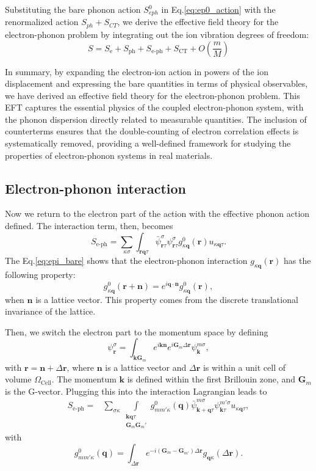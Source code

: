 \documentclass[%
 reprint,
superscriptaddress,
 amsmath,amssymb,
 aps,
prx,
]{revtex4-2}
\newcommand{\br}{\mathbf{r}}
\newcommand{\bq}{\mathbf{q}}
\newcommand{\bk}{\mathbf{k}}
\newcommand{\bG}{\mathbf{G}}
\newcommand{\bn}{\mathbf{n}}
\newcommand{\txe}{\text{e}}
\newcommand{\txph}{\text{ph}}
\newcommand{\txCT}{\text{CT}}
\newcommand{\txeph}{\text{e-ph}}
\begin{document}
\begin{appendices}
Substituting the bare phonon action $S^0_{eph}$ in Eq.\eqref{eq:ep0_action} with the renormalized action $S_{ph} + S_{CT}$, we derive the effective field theory for the electron-phonon problem by integrating out the ion vibration degrees of freedom:
\begin{equation}
    S=S_\txe+S_{\txph}+S_{\txeph}+S_{\txCT}+O\left(\frac{m}{M}\right)
\end{equation}

In summary, by expanding the electron-ion action in powers of the ion displacement and expressing the bare quantities in terms of physical observables, we have derived an effective field theory for the electron-phonon problem. This EFT captures the essential physics of the coupled electron-phonon system, with the phonon dispersion directly related to measurable quantities. The inclusion of counterterms ensures that the double-counting of electron correlation effects is systematically removed, providing a well-defined framework for studying the properties of electron-phonon systems in real materials.

\subsection{Electron-phonon interaction}
\label{app:epi}


Now we return to the electron part of the action with the effective phonon action defined.
The interaction term, then, becomes
\begin{equation}
  S_{\txeph} = \sum_{\kappa\sigma} \int_{\br\bq\tau} \bar{\psi}_{\br\tau}^{\sigma}\psi_{\br\tau}^{\sigma}g^0_{\kappa\bq}(\br)u_{\kappa\bq\tau}.
\end{equation}
The Eq.\eqref{eq:epi_bare} shows that the electron-phonon interaction $g_{\kappa\bq}(\br)$ has the following property:
\begin{equation}
    g^0_{\kappa\bq}(\br+\bn)=e^{i\bq\cdot\bn}g^0_{\kappa\bq}(\br),
\end{equation}
when $\bn$ is a lattice vector. This property comes from the discrete translational invariance of the lattice.

Then, we switch the electron part to the momentum space by defining
\begin{equation}
    \psi_{\br}^{\sigma} = \int_{\bk\bG_m}e^{i\bk\bn}e^{i\bG_m\Delta\br} \psi_{\bk}^{m\sigma},
\end{equation}
with $\br=\bn+\Delta\br$, where $\bn$ is a lattice vector and $\Delta\br$ is within a unit cell of volume $\Omega_\text{Cell}$. The momentum $\bk$ is defined within the first Brillouin zone, and $\bG_m$ is the G-vector. 
Plugging this into the interaction Lagrangian leads to
\begin{align}
  S_{\txeph} =& \sum_{\sigma\kappa}\int\limits_{\substack{
    \bk\bq\tau\\
    \bG_m\bG_m'
  }} g^0_{mm'\kappa}(\bq) \bar{\psi}_{\bk+\bq\tau}^{m\sigma}\psi_{\bk\tau}^{m'\sigma}u_{\kappa\bq\tau},
\end{align}
with 
\begin{equation}
    g^0_{mm'\kappa}(\bq)=\int_{\Delta\br}e^{-i(\bG_m-\bG_{m'})\Delta\br}g_{\bq\kappa}(\Delta\br).
\end{equation}


\end{appendices}
\end{document}
